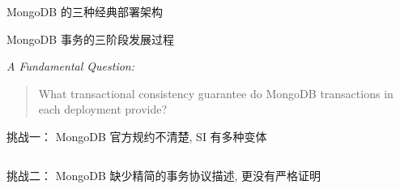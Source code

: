 
\begin{frame}{}
\end{frame}

\begin{frame}{}
  \begin{center}
	MongoDB 的三种经典部署架构
  \end{center}
\end{frame}

\begin{frame}{}
  \begin{center}
	MongoDB 事务的三阶段发展过程
  \end{center}
\end{frame}

\begin{frame}{}
  \begin{center}
	\emph{\Large A Fundamental Question:} \\[20pt]

	\begin{quote}
	  {\large What transactional consistency guarantee do MongoDB transactions
	  in each deployment provide?}
	\end{quote}
  \end{center}
\end{frame}

\begin{frame}{}
  \begin{center}
	挑战一： MongoDB 官方规约不清楚, SI 有多种变体
  \end{center}

  \begin{columns}
  \end{columns}
\end{frame}

\begin{frame}{}
  \begin{center}
	挑战二： MongoDB 缺少精简的事务协议描述, 更没有严格证明
  \end{center}

\end{frame}

